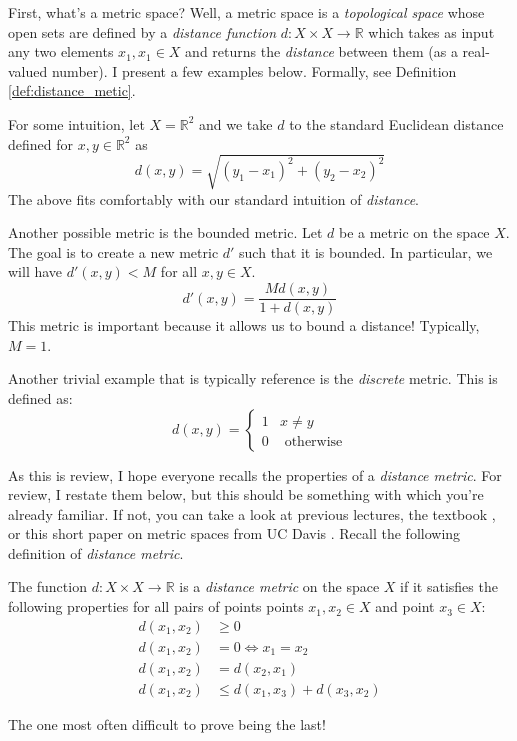 \documentclass[english, 11pt]{article}
\begin{document}
  First, what's a metric space? Well, a metric space is a \textit{topological space} whose open sets are defined by a \textit{distance function} $d: X \times X \to \mathbb{R}$ which takes as input any two elements $x_1,x_1 \in X$ and returns the \textit{distance} between them (as a real-valued number). I present a few examples below. Formally, see Definition \ref{def:distance_metic}. \\

  \begin{exmp}
  \label{exmp:eucledian}
  For some intuition, let $X = \mathbb{R}^2$ and we take $d$ to the standard Euclidean distance defined for $x,y \in \mathbb{R}^2$ as
  $$
  d(x,y) = \sqrt{(y_1 - x_1)^2 + (y_2 - x_2)^2}
  $$
  The above fits comfortably with our standard intuition of \textit{distance}.\\
  \end{exmp}
  \begin{exmp}
  Another possible metric is the bounded metric. Let $d$ be a metric on the space $X$. The goal is to create a new metric $d'$ such that it is bounded. In particular, we will have $d'(x,y) < M$ for all $x,y \in X$.
  $$
  d'(x,y) = \frac{Md(x,y)}{1 + d(x,y)}
  $$
  This metric is important because it allows us to bound a distance! Typically, $M = 1$.
  \end{exmp}
  \begin{exmp}
  Another trivial example that is typically reference is the \textit{discrete} metric. This is defined as:
  \[
  d(x,y) =
  \begin{cases}
    1 & x \neq y \\
    0 & \text{ otherwise}
  \end{cases}
  \]
  \end{exmp}

  As this is review, I hope everyone recalls the properties of a \textit{distance metric}. For review, I restate them below, but this should be something with which you're already familiar. If not, you can take a look at previous lectures, the textbook \cite{topology_book}, or this short paper on metric spaces from UC Davis \cite{metric_spaces}.
  Recall the following definition of \textit{distance metric}.

  \begin{defn}
  \label{def:distance_metic}
    The function $d: X \times X \to \mathbb{R}$ is a \textit{distance metric} on the space $X$ if it satisfies the following properties for all pairs of points points $x_1,x_2 \in X$ and point $x_3 \in X$:
    \begin{align*}
      d(x_1,x_2) &\geq 0 \tag{positivity} \\
      d(x_1,x_2) &= 0 \iff x_1 = x_2 \tag{equality of points} \\
      d(x_1,x_2) &= d(x_2,x_1) \tag{symmetry} \\
      d(x_1,x_2) &\leq d(x_1,x_3) + d(x_3, x_2) \tag{triangle inequality}
    \end{align*}
  \end{defn}
  The one most often difficult to prove being the last!
\end{document}
